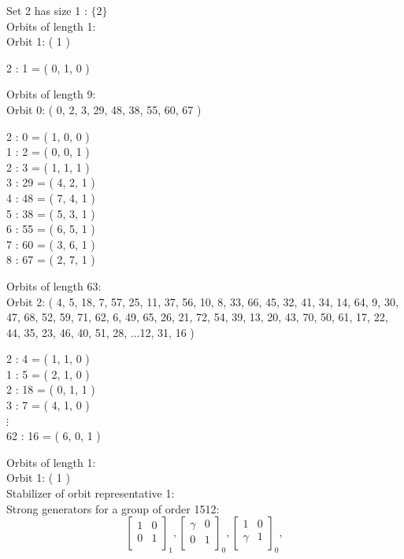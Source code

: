 Set 2 has size 1 : $\{ 2 \}$\\
Orbits of length 1:\\
Orbit 1:
( 1 )\\
\begin{multicols}{2}
 : 1 = ( 0, 1, 0 )\\
\end{multicols}
Orbits of length 9:\\
Orbit 0:
( 0, 2, 3, 29, 48, 38, 55, 60, 67 )\\
\begin{multicols}{2}
 : 0 = ( 1, 0, 0 )\\
1 : 2 = ( 0, 0, 1 )\\
2 : 3 = ( 1, 1, 1 )\\
3 : 29 = ( 4, 2, 1 )\\
4 : 48 = ( 7, 4, 1 )\\
5 : 38 = ( 5, 3, 1 )\\
6 : 55 = ( 6, 5, 1 )\\
7 : 60 = ( 3, 6, 1 )\\
8 : 67 = ( 2, 7, 1 )\\
\end{multicols}
Orbits of length 63:\\
Orbit 2:
( 4, 5, 18, 7, 57, 25, 11, 37, 56, 10, 8, 33, 66, 45, 32, 41, 34, 14, 64, 9, 30, 47, 68, 52, 59, 71, 62, 6, 49, 65, 26, 21, 72, 54, 39, 13, 20, 43, 70, 50, 61, 17, 22, 44, 35, 23, 46, 40, 51, 28, ...12, 31, 16 )\\
\begin{multicols}{2}
 : 4 = ( 1, 1, 0 )\\
1 : 5 = ( 2, 1, 0 )\\
2 : 18 = ( 0, 1, 1 )\\
3 : 7 = ( 4, 1, 0 )\\
$\vdots$\\
62 : 16 = ( 6, 0, 1 )\\
\end{multicols}
\bigskip
Orbits of length 1:\\
Orbit 1:
( 1 )\\
Stabilizer of orbit representative 1:\\
Strong generators for a group of order 1512:
$$
\left[
\begin{array}{*{2}{r}}
1 & 0\\
0 & 1\\
\end{array}
\right]
_{1}
, 
\left[
\begin{array}{*{2}{r}}
\gamma  & 0\\
0 & 1\\
\end{array}
\right]
_{0}
, 
\left[
\begin{array}{*{2}{r}}
1 & 0\\
\gamma  & 1\\
\end{array}
\right]
_{0}
, 
$$
